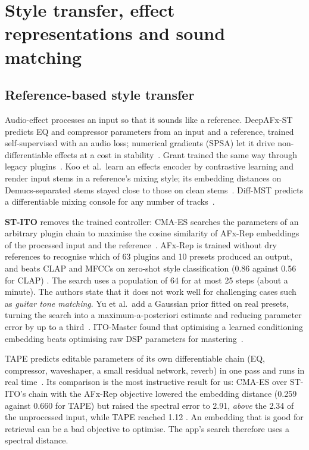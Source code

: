\section{Style transfer, effect representations and sound matching}
\label{sec:matching}

\subsection{Reference-based style transfer}

Audio-effect  processes an input so that it sounds like a
reference. DeepAFx-ST predicts EQ and compressor parameters from an input and a
reference, trained self-supervised with an audio loss; numerical gradients (SPSA)
let it drive non-differentiable effects at a cost in
stability~\cite{steinmetz2022style}. Grant trained the same way through legacy
plugins~\cite{grant2023style}. Koo et al.\ learn an effects encoder by
contrastive learning and render input stems in a reference's mixing style; its
embedding distances on Demucs-separated stems stayed close to those on clean
stems~\cite{koo2023music}. Diff-MST predicts a differentiable mixing console for
any number of tracks~\cite{vanka2024diffmst}.

\textbf{ST-ITO} removes the trained controller: CMA-ES searches the parameters of
an arbitrary plugin chain to maximise the cosine similarity of AFx-Rep embeddings
of the processed input and the reference~\cite{steinmetz2024stito}. AFx-Rep is
trained without dry references to recognise which of 63 plugins and 10 presets
produced an output, and beats CLAP and MFCCs on zero-shot style classification
(0.86 against 0.56 for CLAP) \reported. The search uses a population of 64 for at
most 25 steps (about a minute). The authors state that it does not work well for
challenging cases such as \emph{guitar tone matching}. Yu et al.\ add a Gaussian
prior fitted on real presets, turning the search into a maximum-a-posteriori
estimate and reducing parameter error by up to a third~\cite{yu2025improving}.
ITO-Master found that optimising a learned conditioning embedding beats
optimising raw DSP parameters for mastering~\cite{koo2025itomaster}.

\begin{caution}
TAPE predicts editable parameters of its own differentiable chain (EQ,
compressor, waveshaper, a small residual network, reverb) in one pass and runs in
real time~\cite{long2026tape}. Its comparison is the most instructive result for
us: CMA-ES over ST-ITO's chain with the AFx-Rep objective lowered the embedding
distance (0.259 against 0.660 for TAPE) but raised the spectral error to 2.91,
\emph{above} the 2.34 of the unprocessed input, while TAPE reached 1.12
\reported. An embedding that is good for retrieval can be a bad objective to
optimise. The app's search therefore uses a spectral distance.
\end{caution}

